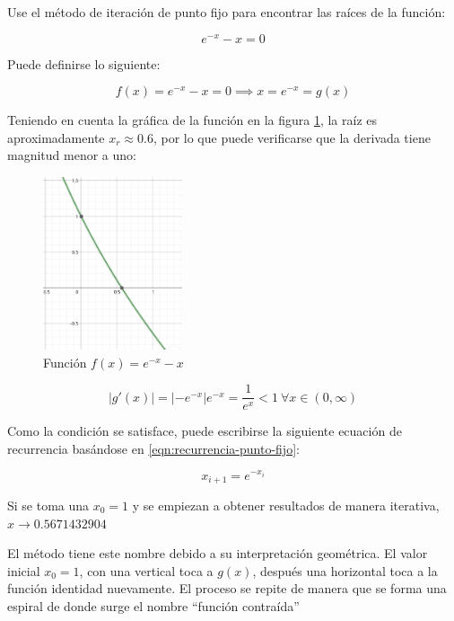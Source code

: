 \begin{ex}
    Use el método de iteración de punto fijo para encontrar las raíces de la
    función:

    \[
        e^{-x} - x = 0
    \]

    \begin{solution}
        Puede definirse lo siguiente:

        \[
            f(x) = e^{-x} - x = 0 \implies x = e^{-x} = g(x)
        \]

        Teniendo en cuenta la gráfica de la función en la figura
        \ref{fig:ejercicio-punto-fijo}, la raíz es aproximadamente $x_r \approx
        0.6$, por lo que puede verificarse que la derivada tiene magnitud menor
        a uno:

        \begin{figure}
            \centering
            \includegraphics[height=2in]{img/punto-fijo-img.png}
            \caption{Función $f(x) = e^{-x} - x$}
            \label{fig:ejercicio-punto-fijo}
        \end{figure}

        \[
            \left| g'(x) \right| = \left| -e^{-x} \right| e^{-x} =
            \frac{1}{e^x} < 1\ \forall x \in (0, \infty)
        \]

        Como la condición se satisface, puede escribirse la siguiente ecuación
        de recurrencia basándose en \ref{eqn:recurrencia-punto-fijo}:

        \[
            x_{i+1} = e^{-x_i}
        \]

        Si se toma una $x_0 = 1$ y se empiezan a obtener resultados de
        manera iterativa, $x \rightarrow 0.5671432904$

    \end{solution}
\end{ex}

El método tiene este nombre debido a su interpretación geométrica. El valor
inicial $x_0 = 1$, con una vertical toca a $g(x)$, después una horizontal toca a
la función identidad nuevamente. El proceso se repite de manera que se forma una
espiral de donde surge el nombre ``función contraída''

